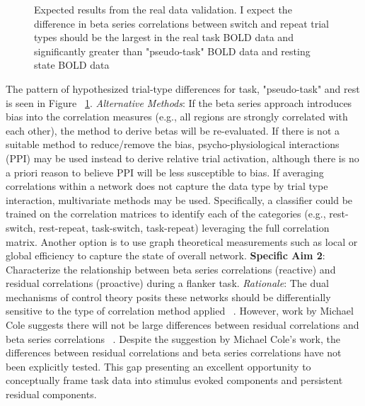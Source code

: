 \documentclass[phd,appendix,figures]{uithesis}
\begin{document}
\begin{itemize}
\begin{figure}[H]
	\caption{Expected results from the real data validation.
	I expect the difference in beta series correlations between switch and repeat trial types should be the largest in the real task BOLD data and significantly greater than "pseudo-task" BOLD data and resting state BOLD data}
	\label{fig:aim_1_validation}
\end{figure}
The pattern of hypothesized trial-type differences for task, "pseudo-task" and rest is seen in Figure ~\ref{fig:aim_1_validation}.
\newline
\newline
\textit{Alternative Methods}: If the beta series approach introduces bias into the correlation measures (e.g., all regions are strongly correlated with each other), the method to derive betas will be re-evaluated.
If there is not a suitable method to reduce/remove the bias, psycho-physiological interactions (PPI) may be used instead to derive relative trial activation, although there is no a priori reason to believe PPI will be less susceptible to bias.
If averaging correlations within a network does not capture the data type by trial type interaction, multivariate methods may be used.
Specifically, a classifier could be trained on the correlation matrices to identify each of the categories (e.g., rest-switch, rest-repeat, task-switch, task-repeat)
leveraging the full correlation matrix.
Another option is to use graph theoretical measurements such as local or global efficiency to capture the state of overall network.
\newline
\newline
\textbf{Specific Aim 2}: Characterize the relationship between beta series correlations (reactive) and residual correlations (proactive) during a flanker task.
\newline
\newline
\textit{Rationale}: The dual mechanisms of control theory posits these networks should be differentially sensitive to the type of correlation method applied ~\citep{Dosenbach2007,Braver2006}.
However, work by Michael Cole suggests there will not be large differences between residual correlations and beta series correlations ~\citep{Cole2019}.
Despite the suggestion by Michael Cole's work, the differences between residual correlations and beta series correlations have not been explicitly tested.
This gap presenting an excellent opportunity to conceptually frame task data into stimulus evoked components and persistent residual components.
\newline
\newline

\end{itemize}
\end{document}
